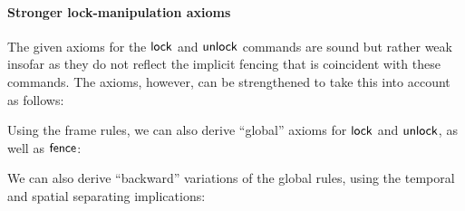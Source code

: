 \documentclass[11pt]{report}         %
\begin{document}


\paragraph{Stronger lock-manipulation axioms} The given axioms for the $\operatorname{\mathsf{lock}}$ and $\operatorname{\mathsf{unlock}}$ commands are sound but rather weak insofar as they do not reflect the implicit fencing that is coincident with these commands. The axioms, however, can be strengthened to take this into account as follows: 

Using the frame rules, we can also derive ``global'' axioms for $\operatorname{\mathsf{lock}}$ and $\operatorname{\mathsf{unlock}}$, as well as $\operatorname{\mathsf{fence}}$: 
  

We can also derive ``backward'' variations of the global rules, using the temporal and spatial separating implications: 
\end{document}
